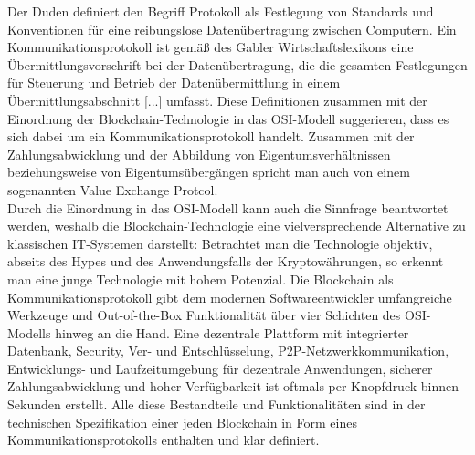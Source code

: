 Der Duden \cite{Duden2006} definiert den Begriff Protokoll als \glqq Festlegung von Standards und Konventionen für eine reibungslose Datenübertragung zwischen Computern\grqq. Ein Kommunikationsprotokoll ist gemäß des Gabler Wirtschaftslexikons \cite{Gabler2004} \glqq eine Übermittlungsvorschrift bei der Datenübertragung, die die gesamten Festlegungen für Steuerung und Betrieb der Datenübermittlung in einem Übermittlungsabschnitt [...] umfasst\grqq. Diese Definitionen zusammen mit der Einordnung der Blockchain-Technologie in das \ac{OSI}-Modell suggerieren, dass es sich dabei um ein Kommunikationsprotokoll handelt. Zusammen mit der Zahlungsabwicklung und der Abbildung von Eigentumsverhältnissen beziehungsweise von Eigentumsübergängen spricht man auch von einem sogenannten \glqq Value Exchange Protcol\grqq \cite{bheemaiah2015}.\\
Durch die Einordnung in das \ac{OSI}-Modell kann auch die Sinnfrage beantwortet werden, weshalb die Blockchain-Technologie eine vielversprechende Alternative zu klassischen IT-Systemen darstellt: Betrachtet man die Technologie objektiv, abseits des Hypes und des Anwendungsfalls der Kryptowährungen, so erkennt man eine junge Technologie mit hohem Potenzial. Die Blockchain als Kommunikationsprotokoll gibt dem modernen Softwareentwickler umfangreiche Werkzeuge und Out-of-the-Box Funktionalität über vier Schichten des \ac{OSI}-Modells hinweg an die Hand. Eine dezentrale Plattform mit integrierter Datenbank, Security, Ver- und Entschlüsselung, \ac{P2P}-Netzwerkkommunikation, Entwicklungs- und Laufzeitumgebung für dezentrale Anwendungen, sicherer Zahlungsabwicklung und hoher Verfügbarkeit ist oftmals per Knopfdruck binnen Sekunden erstellt. Alle diese Bestandteile und Funktionalitäten sind in der technischen Spezifikation einer jeden Blockchain in Form eines Kommunikationsprotokolls enthalten und klar definiert.


%
%
